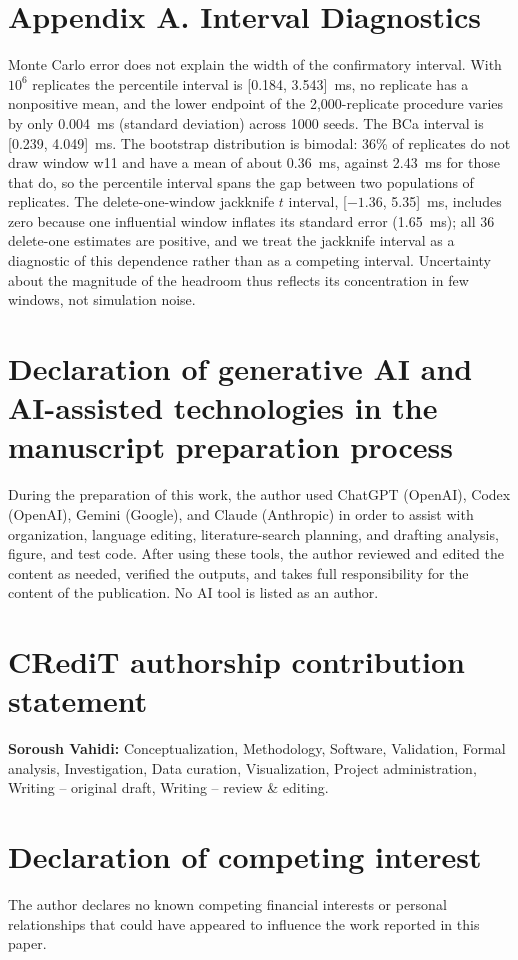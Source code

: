 \documentclass[preprint,12pt]{elsarticle}
\begin{document}
\section*{Appendix A. Interval Diagnostics}
Monte Carlo error does not explain the width of the confirmatory interval.
With $10^6$ replicates the percentile interval is [0.184, 3.543]~ms, no
replicate has a nonpositive mean, and the lower endpoint of the 2,000-replicate
procedure varies by only 0.004~ms (standard deviation) across 1000 seeds. The BCa
interval is [0.239, 4.049]~ms. The bootstrap distribution is bimodal: 36\% of
replicates do not draw window w11 and have a mean of about 0.36~ms, against
2.43~ms for those that do, so the percentile interval spans the gap between
two populations of replicates. The delete-one-window jackknife $t$ interval,
[$-1.36$, 5.35]~ms, includes zero because one influential window inflates its
standard error (1.65~ms); all 36 delete-one estimates are positive, and we
treat the jackknife interval as a diagnostic of this dependence rather than as
a competing interval. Uncertainty about the magnitude of the headroom thus
reflects its concentration in few windows, not simulation noise.

\section*{Declaration of generative AI and AI-assisted technologies in the manuscript preparation process}
During the preparation of this work, the author used ChatGPT (OpenAI), Codex (OpenAI), Gemini (Google), and Claude (Anthropic) in order to assist with organization, language editing, literature-search planning, and drafting analysis, figure, and test code. After using these tools, the author reviewed and edited the content as needed, verified the outputs, and takes full responsibility for the content of the publication. No AI tool is listed as an author.

\section*{CRediT authorship contribution statement}
\textbf{Soroush Vahidi:} Conceptualization, Methodology, Software, Validation, Formal analysis, Investigation, Data curation, Visualization, Project administration, Writing -- original draft, Writing -- review \& editing.

\section*{Declaration of competing interest}
The author declares no known competing financial interests or personal relationships that could have appeared to influence the work reported in this paper.
\end{document}

